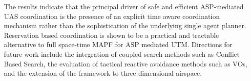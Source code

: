 \vspace{10pt}

The results indicate that the principal driver of safe and efficient ASP-mediated UAS coordination is the presence of an explicit time aware coordination mechanism rather than the sophistication of the underlying single agent planner. Reservation based coordination is shown to be a practical and tractable alternative to full space-time MAPF for ASP mediated UTM. Directions for future work include the integration of coupled search methods such as Conflict Based Search, the evaluation of tactical reactive avoidance methods such as VOs, and the extension of the framework to three dimensional airspace.